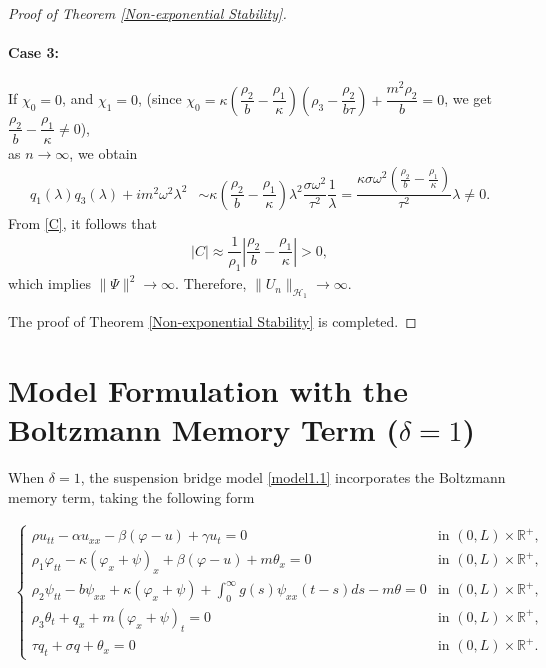 \documentclass[11pt,reqno]{article}
\let\Section=\section
\def\section{\setcounter{equation}{0}\Section}
\begin{document}
\begin{proof}[Proof of Theorem \ref{Non-exponential Stability}]
  	\paragraph{Case 3:}If $\chi_0 = 0$, and $\chi_1 = 0$, (since $\chi_0 = \kappa\left(\dfrac{\rho_2}{b} -  \dfrac{\rho_1}{\kappa}\right)\left(\rho_3 - \dfrac{\rho_2}{b\tau}\right) + \dfrac{m^2 \rho_2}{b} = 0$, we get $\dfrac{\rho_2}{b} - \dfrac{\rho_1}{\kappa} \neq 0$),\\as $n \to \infty$, we obtain
  	\begin{align*}
	  		q_1(\lambda)q_3(\lambda) + im^2\omega^2\lambda^2 &\sim \kappa(\dfrac{\rho_2}{b} - \dfrac{\rho_1}{\kappa}) \lambda^2 \dfrac{\sigma\omega^2}{\tau^2} \dfrac{1}{\lambda} = \dfrac{\kappa\sigma\omega^2(\frac{\rho_2}{b} - \frac{\rho_1}{\kappa})}{\tau^2} \lambda \neq 0.
  	\end{align*}
  	From \eqref{C}, it follows that
  	\begin{align*}
  		|C| \approx \dfrac{1}{\rho_1}\left|\dfrac{\rho_2}{b} - \dfrac{\rho_1}{\kappa}\right| > 0,
  	\end{align*}
  	which implies $\|\Psi\|^2 \to \infty$. Therefore, $\|U_n\|_{\mathcal{H}_1} \to \infty$.
  	
  	The proof of Theorem \ref{Non-exponential Stability} is completed.
  \end{proof}
\section{Model Formulation with the Boltzmann Memory Term ($\delta = 1$)} \label{sec3}
When $\delta = 1$, the suspension bridge model \eqref{model1.1} incorporates the Boltzmann memory term, taking the following form

\begin{align}\label{eq:with memory}
	\begin{cases}
		\rho u_{tt} - \alpha u_{xx} - \beta(\varphi - u) + \gamma u_t = 0 & \text{in } (0,L) \times \mathbb{R}^+, \\
		\rho_1 \varphi_{tt} - \kappa(\varphi_x + \psi)_x + \beta (\varphi - u) + m \theta_x = 0 & \text{in } (0,L) \times \mathbb{R}^+, \\
		\rho_2 \psi_{tt} - b \psi_{xx} + \kappa(\varphi_x + \psi) + \int_0^\infty g(s) \psi_{xx}(t-s)  ds - m \theta = 0 & \text{in } (0,L) \times \mathbb{R}^+, \\
		\rho_3 \theta_t + q_x + m (\varphi_x + \psi)_t = 0 & \text{in } (0,L) \times \mathbb{R}^+, \\
		\tau q_t + \sigma q + \theta_x = 0& \text{in } (0,L) \times \mathbb{R}^+.
	\end{cases}
\end{align}
\end{document}
